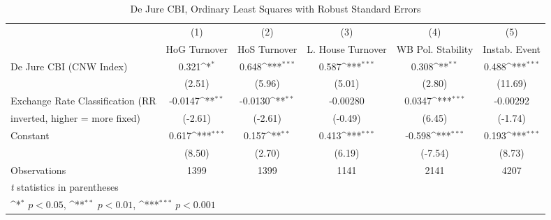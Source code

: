 \begin{table}[htbp]\centering
\def\sym#1{\ifmmode^{#1}\else\(^{#1}\)\fi}
\caption{De Jure CBI, Ordinary Least Squares with Robust Standard Errors \label{multIndOLSDJ}}
\begin{tabular}{l*{5}{c}}
\toprule
                                        &\multicolumn{1}{c}{(1)}&\multicolumn{1}{c}{(2)}&\multicolumn{1}{c}{(3)}&\multicolumn{1}{c}{(4)}&\multicolumn{1}{c}{(5)}\\
                                        &\multicolumn{1}{c}{HoG Turnover}&\multicolumn{1}{c}{HoS Turnover}&\multicolumn{1}{c}{L. House Turnover}&\multicolumn{1}{c}{WB Pol. Stability}&\multicolumn{1}{c}{Instab. Event}\\
\midrule
De Jure CBI (CNW Index)                 &    0.321\sym{*}  &    0.648\sym{***}&    0.587\sym{***}&    0.308\sym{**} &    0.488\sym{***}\\
                                        &   (2.51)         &   (5.96)         &   (5.01)         &   (2.80)         &  (11.69)         \\
\addlinespace
Exchange Rate Classification (RR        &  -0.0147\sym{**} &  -0.0130\sym{**} & -0.00280         &   0.0347\sym{***}& -0.00292         \\
inverted, higher = more fixed)          &  (-2.61)         &  (-2.61)         &  (-0.49)         &   (6.45)         &  (-1.74)         \\
\addlinespace
Constant                                &    0.617\sym{***}&    0.157\sym{**} &    0.413\sym{***}&   -0.598\sym{***}&    0.193\sym{***}\\
                                        &   (8.50)         &   (2.70)         &   (6.19)         &  (-7.54)         &   (8.73)         \\
\midrule
Observations                            &     1399         &     1399         &     1141         &     2141         &     4207         \\
\bottomrule
\multicolumn{6}{l}{\footnotesize \textit{t} statistics in parentheses}\\
\multicolumn{6}{l}{\footnotesize \sym{*} \(p<0.05\), \sym{**} \(p<0.01\), \sym{***} \(p<0.001\)}\\
\end{tabular}
\end{table}
